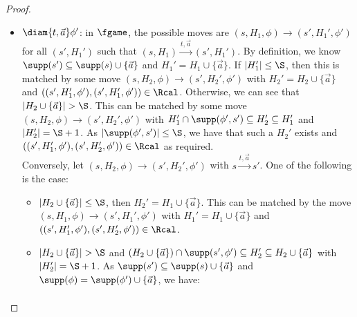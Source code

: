 \begin{proof}
\begin{itemize}
\begin{itemize}
        \item If $a \in H_2$ or $a \notin H_1$, then
          $(s, H_1, \bigvee_x \phi')$ $ \rightarrow (s, H_1, \phi'\{a/x\})\Rcal(s, H_2, \phi'\{a/x\})$.
            \item If $a \in H_1 \setminus H_2$, then let us choose the transition $(s, H_1, \bigvee_x \phi') \to (s, H_1, \phi'\{b/x\})$ for some $b \notin H_1 \cup \supp(\phi', s)$.
            Then, we have that $(s, H_1, \phi'\{b/x\}) \nomeq (s, H_{1(-a+b)}, \phi'\{a/x\})$ and $((s, H_{1(-a+b)}, \phi'\{a/x\}),(s, H_2, \phi'\{a/x\})) \in \Rcal$ as required.
        \end{itemize}
        \item $\diam{t, \vec a} \phi'$: in $\fgame$, the possible moves are $(s, H_1, \phi) \rightarrow (s', H_1', \phi')$ for all $(s', H_1')$ such that $(s, H_1) \xrightarrow{t, \vec a} (s', H_1')$.
        By definition, we know $\supp(s') \subseteq \supp(s) \cup \{\vec a\}$ and $H_1' = H_1 \cup \{\vec a\}$. 
        If $|H_1'| \le \S$, then this is matched by some move $(s,H_2,\phi) \rightarrow (s', H_2', \phi')$ with $H_2' = H_2 \cup \{\vec a\}$ and $((s', H_1', \phi'),(s',H_1',\phi')) \in \Rcal$. 
        Otherwise, we can see that $|H_2 \cup \{\vec a\}| > \S$. This can be matched by some move $(s,H_2,\phi) \rightarrow (s', H_2', \phi')$ with $H_1' \cap \supp(\phi', s') \subseteq H_2' \subseteq H_1'$ and $|H_2'| = \S + 1$. 
        As $|\supp(\phi',s')| \le \S$, we have that such a $H_2'$ exists and $((s', H_1', \phi'),(s',H_2',\phi')) \in \Rcal$ as required.
        \\
        Conversely, let $(s, H_2, \phi) \rightarrow (s', H_2', \phi')$ with $s\xrightarrow{t, \vec a} s'$. One of the following is the case:
        \begin{itemize}
            \item $|H_2 \cup \{\vec a\}| \le \S$, then $H_2' = H_1 \cup \{\vec a\}$. 
            This can be matched by the move $(s, H_1, \phi) \rightarrow (s', H_1', \phi')$ with $H_1' = H_1 \cup \{\vec a\}$ and $((s', H_1', \phi'),(s',H_2',\phi')) \in \Rcal$.
            \item $|H_2 \cup \{\vec a\}| > \S$ and $(H_2 \cup \{\vec a\}) \cap \supp(s', \phi') \subseteq H_2' \subseteq H_2 \cup \{\vec a\}$ with $|H_2'| = \S + 1$. 
            As $\supp(s') \subseteq \supp(s) \cup \{\vec a\}$ and $\supp(\phi) = \supp(\phi') \cup \{\vec a\}$, we have:
            \begin{align*}

\end{align*}
\end{itemize}
\end{itemize}
\end{proof}
